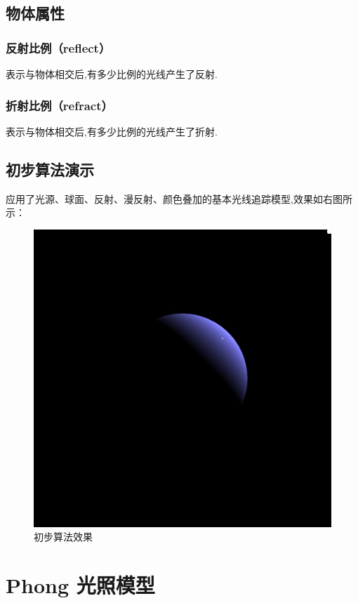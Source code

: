\documentclass[10pt,twocolumn]{article}
\begin{document}
\subsection{\hei 物体属性}
\subsubsection{\hei 反射比例（reflect）}
表示与物体相交后,有多少比例的光线产生了反射.
\subsubsection{\hei 折射比例（refract）}
表示与物体相交后,有多少比例的光线产生了折射.

\subsection{\hei 初步算法演示}
应用了光源、球面、反射、漫反射、颜色叠加的基本光线追踪模型,效果如右图所示：

\newpage

\begin{figure}[!ht]
\centering
\includegraphics[scale=.2]{fig2.jpg}
\caption{初步算法效果}
\end{figure}

\section{\hei Phong 光照模型}
\end{document}

